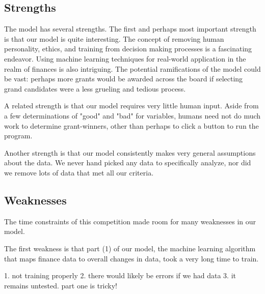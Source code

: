 \documentclass[paper.tex]{subfiles}
\begin{document}
	\subsection{Strengths}
	The model has several strengths. The first and perhaps most important strength is that our model is quite interesting. The concept of removing human personality, ethics, and training from decision making processes is a fascinating endeavor. Using machine learning techniques for real-world application in the realm of finances is also intriguing. The potential ramifications of the model could be vast: perhaps more grants would be awarded across the board if selecting grand candidates were a less grueling and tedious process. 
	
	A related strength is that our model requires very little human input. Aside from a few determinations of "good" and "bad" for variables, humans need not do much work to determine grant-winners, other than perhaps to click a button to run the program.
	
	Another strength is that our model consistently makes very general assumptions about the data. We never hand picked any data to specifically analyze, nor did we remove lots of data that met all our criteria. 
		
	\subsection{Weaknesses}
	The time constraints of this competition made room for many weaknesses in our model.
	
	The first weakness is that part (1) of our model, the machine learning algorithm that maps finance data to overall changes in data, took a very long time to train.
	
	1. not training properly
	2. there would likely be errors if we had data
	3. it remains untested. part one is tricky!
\end{document}

